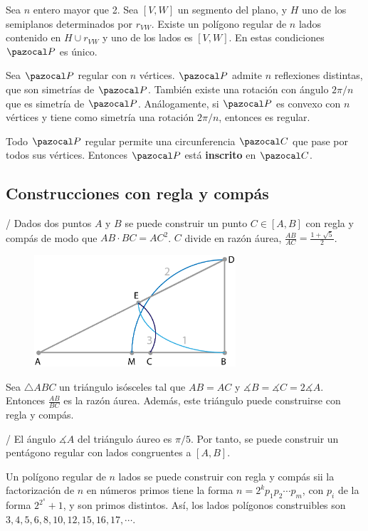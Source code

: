   Sea $n$ entero mayor que 2. Sea $[V,W]$ un segmento del plano, y $H$ uno de los semiplanos determinados por $r_{VW}$. Existe un polígono regular de $n$ lados contenido en $H \cup r_{VW}$ y uno de los lados es $[V,W]$.  En estas condiciones $\PP$ es único.
 
  Sea $\PP$ regular con $n$ vértices. $\PP$ admite $n$ reflexiones distintas, que son simetrías de $\PP$. También existe una rotación con ángulo $2\pi/n$ que es simetría de $\PP$. Análogamente, si $\PP$ es convexo con $n$ vértices y tiene como simetría una rotación $2\pi/n$, entonces es regular.
 
 Todo $\PP$ regular permite una circunferencia $\C$ que pase por todos sus vértices. Entonces $\PP$ está \textbf{inscrito} en $\C$.
\vspace{-2em}
\subsection*{Construcciones con regla y compás}
/ Dados dos puntos $A$ y $B$ se puede construir un punto $C \in [A,B]$ con regla y compás de modo que $AB\cdot BC = AC^2$. $C$ divide en razón áurea, $\frac{AB}{AC} = \frac{1+\sqrt{5}}{2}$.
	\begin{figure}[H]
	\centering
	\includegraphics[width=7.5cm]{figuras/10-24.pdf}
	\vspace{-1em}
\end{figure}
\obligatorio{}

 Sea $\triangle ABC$ un triángulo isósceles tal que $AB = AC$ y $\measuredangle B = \measuredangle C = 2\measuredangle A$. Entonces $\frac{AB}{BC}$ es la razón áurea. Además, este triángulo puede construirse con regla y compás.

/ El ángulo $\measuredangle A$ del triángulo áureo es $\pi/5$. Por tanto, se puede construir un pentágono regular con lados congruentes a $[A,B]$.

 Un polígono regular de $n$ lados se puede construir con regla y compás sii la factorización de $n$ en números primos tiene la forma $n = 2^kp_1p_2\cdots p_m$, con $p_i$ de la forma $2^{2^s}+1$, y son primos distintos. Así, los lados polígonos construibles son $3,4,5,6,8,10,12,15,16,17, \cdots$.



 

